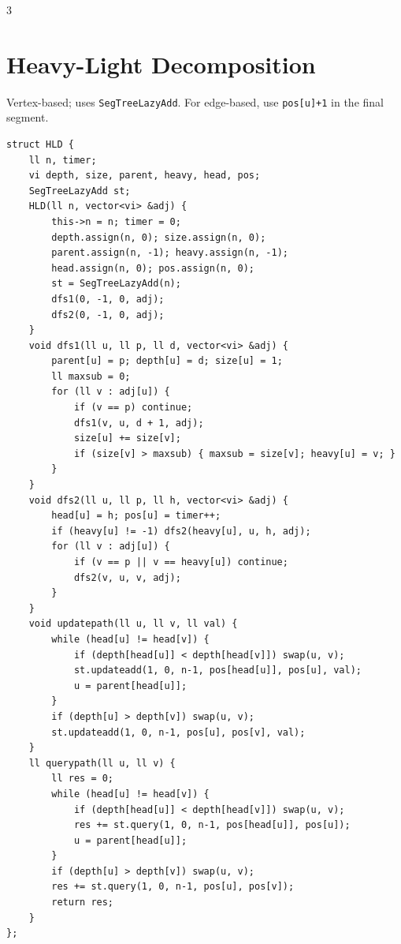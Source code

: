 \documentclass[10pt]{article}
\newcommand{\note}[1]{{\scriptsize #1}\par}
\begin{document}
\begin{multicols*}{3}
\section{Heavy-Light Decomposition}
\note{Vertex-based; uses \texttt{SegTreeLazyAdd}. For edge-based, use \texttt{pos[u]+1} in the final segment.}
\begin{lstlisting}
struct HLD {
    ll n, timer;
    vi depth, size, parent, heavy, head, pos;
    SegTreeLazyAdd st;
    HLD(ll n, vector<vi> &adj) {
        this->n = n; timer = 0;
        depth.assign(n, 0); size.assign(n, 0);
        parent.assign(n, -1); heavy.assign(n, -1);
        head.assign(n, 0); pos.assign(n, 0);
        st = SegTreeLazyAdd(n);
        dfs1(0, -1, 0, adj);
        dfs2(0, -1, 0, adj);
    }
    void dfs1(ll u, ll p, ll d, vector<vi> &adj) {
        parent[u] = p; depth[u] = d; size[u] = 1;
        ll maxsub = 0;
        for (ll v : adj[u]) {
            if (v == p) continue;
            dfs1(v, u, d + 1, adj);
            size[u] += size[v];
            if (size[v] > maxsub) { maxsub = size[v]; heavy[u] = v; }
        }
    }
    void dfs2(ll u, ll p, ll h, vector<vi> &adj) {
        head[u] = h; pos[u] = timer++;
        if (heavy[u] != -1) dfs2(heavy[u], u, h, adj);
        for (ll v : adj[u]) {
            if (v == p || v == heavy[u]) continue;
            dfs2(v, u, v, adj);
        }
    }
    void updatepath(ll u, ll v, ll val) {
        while (head[u] != head[v]) {
            if (depth[head[u]] < depth[head[v]]) swap(u, v);
            st.updateadd(1, 0, n-1, pos[head[u]], pos[u], val);
            u = parent[head[u]];
        }
        if (depth[u] > depth[v]) swap(u, v);
        st.updateadd(1, 0, n-1, pos[u], pos[v], val);
    }
    ll querypath(ll u, ll v) {
        ll res = 0;
        while (head[u] != head[v]) {
            if (depth[head[u]] < depth[head[v]]) swap(u, v);
            res += st.query(1, 0, n-1, pos[head[u]], pos[u]);
            u = parent[head[u]];
        }
        if (depth[u] > depth[v]) swap(u, v);
        res += st.query(1, 0, n-1, pos[u], pos[v]);
        return res;
    }
};
\end{lstlisting}


\end{multicols*}
\end{document}
